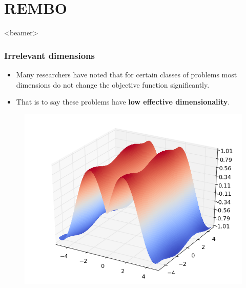 \documentclass[grey]{beamer}
\begin{document}
 

\section{REMBO}
 \begin{frame}<beamer>
  \tableofcontents[currentsection]
 
 \end{frame}
   
 \begin{frame}
   \frametitle{Irrelevant dimensions}
    \begin{minipage}[l]{0.5\columnwidth}
     \begin{itemize}
      \item Many researchers have noted that for certain classes of problems 
       most dimensions do not change the objective function significantly.
      \item That is to say these problems have 
       {\bf \textcolor{myColor}{low effective dimensionality}}.
     \end{itemize}

    \end{minipage}
    \begin{minipage}[r]{0.485\columnwidth}
     \begin{figure}[t]
      \includegraphics[width = 1.2\columnwidth]
      {./figs/irrelevant}
      \label{fig:ESSL_BLR}
     \end{figure}
    \end{minipage}
  \end{frame}
\end{document}
